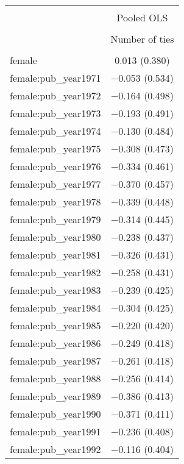 
\begin{table}[!htbp] \centering 
  \caption{} 
  \label{} 
\begin{tabular}{@{\extracolsep{5pt}}lc} 
\\[-1.8ex]\hline 
\hline \\[-1.8ex] 
 & \multicolumn{1}{c}{Pooled OLS} \\ 
\cline{2-2} 
\\[-1.8ex] & Number of ties \\ 
\hline \\[-1.8ex] 
 female & 0.013 (0.380) \\ 
  female:pub\_year1971 & $-$0.053 (0.534) \\ 
  female:pub\_year1972 & $-$0.164 (0.498) \\ 
  female:pub\_year1973 & $-$0.193 (0.491) \\ 
  female:pub\_year1974 & $-$0.130 (0.484) \\ 
  female:pub\_year1975 & $-$0.308 (0.473) \\ 
  female:pub\_year1976 & $-$0.334 (0.461) \\ 
  female:pub\_year1977 & $-$0.370 (0.457) \\ 
  female:pub\_year1978 & $-$0.339 (0.448) \\ 
  female:pub\_year1979 & $-$0.314 (0.445) \\ 
  female:pub\_year1980 & $-$0.238 (0.437) \\ 
  female:pub\_year1981 & $-$0.326 (0.431) \\ 
  female:pub\_year1982 & $-$0.258 (0.431) \\ 
  female:pub\_year1983 & $-$0.239 (0.425) \\ 
  female:pub\_year1984 & $-$0.304 (0.425) \\ 
  female:pub\_year1985 & $-$0.220 (0.420) \\ 
  female:pub\_year1986 & $-$0.249 (0.418) \\ 
  female:pub\_year1987 & $-$0.261 (0.418) \\ 
  female:pub\_year1988 & $-$0.256 (0.414) \\ 
  female:pub\_year1989 & $-$0.386 (0.413) \\ 
  female:pub\_year1990 & $-$0.371 (0.411) \\ 
  female:pub\_year1991 & $-$0.236 (0.408) \\ 
  female:pub\_year1992 & $-$0.116 (0.404) \\ 

\end{tabular}
\end{table}

